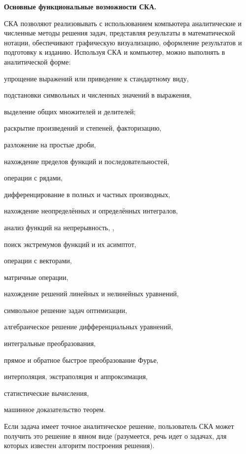 \textbf{Основные функциональные возможности СКА.}

СКА позволяют реализовывать с использованием компьютера аналитические и численные методы решения задач, представляя результаты в математической нотации, обеспечивают графическую визуализацию, оформление результатов и подготовку к изданию. 
Используя СКА и компьютер, можно выполнять в аналитической форме:

\begin{textitemize}
	\item упрощение выражений или приведение к стандартному виду, 
	\item подстановки символьных и численных значений в выражения, 
	\item выделение общих множителей и делителей;
	\item раскрытие произведений и степеней, факторизацию, 
	\item разложение на простые дроби, 
	\item нахождение пределов функций и последовательностей, 
	\item операции с рядами, 
	\item дифференцирование в полных и частных производных, 
	\item нахождение неопределённых и определённых интегралов, 
	\item анализ функций на непрерывность, , 
	\item поиск экстремумов функций и их асимптот, 
	\item операции с векторами, 
	\item матричные операции, 
	\item нахождение решений линейных и нелинейных уравнений, 
	\item символьное решение задач оптимизации, 
	\item алгебраическое решение дифференциальных уравнений, 
	\item интегральные преобразования, 
	\item прямое и обратное быстрое преобразование Фурье, 
	\item интерполяция, экстраполяция и аппроксимация, 
	\item статистические вычисления, 
	\item машинное доказательство теорем.
\end{textitemize}
Если задача имеет точное аналитическое решение, пользователь СКА может получить это решение в явном виде (разумеется, речь идет о задачах, для которых известен алгоритм построения решения).

